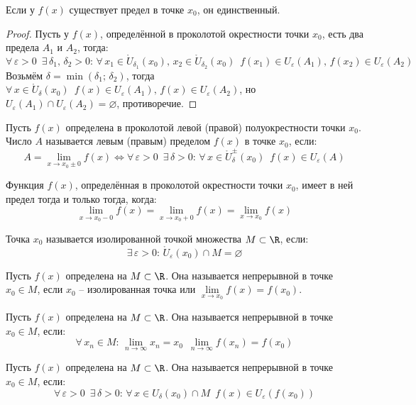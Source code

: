 \documentclass[12pt]{article}
\begin{document}
\begin{theorem}
    Если у $f(x)$ существует предел в точке $x_0$, он единственный.
\end{theorem}
\begin{proof}
    Пусть у $f(x)$, определённой в проколотой окрестности точки $x_0$, есть два предела $A_1$ и $A_2$, тогда:
    $$\forall\,\varepsilon>0\enspace\exists\,\delta_1,\,\delta_2>0:\,\forall\,x_1\in\mathring{U}_{\delta_1}(x_0),\,x_2\in\mathring{U}_{\delta_2}(x_0)\enspace f(x_1)\in U_\varepsilon(A_1),\,f(x_2)\in U_\varepsilon(A_2)$$
    Возьмём $\delta=\min(\delta_1;\,\delta_2)$, тогда $\forall\,x\in\mathring{U}_\delta(x_0)\enspace f(x)\in U_\varepsilon(A_1),\,f(x)\in U_\varepsilon(A_2)$, но $U_\varepsilon(A_1)\cap U_\varepsilon(A_2)=\varnothing$, противоречие.
\end{proof}
\begin{definition}
    Пусть $f(x)$ определена в проколотой левой (правой) полуокрестности точки $x_0$. Число $A$ называется левым (правым) пределом $f(x)$ в точке $x_0$, если:
    $$A=\lim_{x\to x_0\pm0}f(x)\Longleftrightarrow \forall\,\varepsilon>0\enspace\exists\,\delta>0:\,\forall\,x\in\mathring{U}_\delta^\pm(x_0)\enspace f(x)\in U_\varepsilon(A)$$ 
\end{definition}
\begin{statement}
    Функция $f(x)$, определённая в проколотой окрестности точки $x_0$, имеет в ней предел тогда и только тогда, когда:
    $$\lim_{x\to x_0-0}f(x)=\lim_{x\to x_0+0}f(x)=\lim_{x\to x_0}f(x)$$
\end{statement}
\begin{definition}
    Точка $x_0$ называется изолированной точкой множества $M\subset\R$, если:
    $$\exists\,\varepsilon>0:\,\mathring{U}_\varepsilon(x_0)\cap M=\varnothing$$
\end{definition}
\begin{definition}
    Пусть $f(x)$ определена на $M\subset\R$. Она называется непрерывной в точке $x_0\in M$, если $x_0$ -- изолированная точка или $\lim\limits_{x\to x_0}f(x)=f(x_0)$.
\end{definition}
\begin{definition}
    Пусть $f(x)$ определена на $M\subset\R$. Она называется непрерывной в точке $x_0\in M$, если:
    $$\forall\,x_n\in M:\,\lim_{n\to\infty}x_n=x_0\enspace \lim_{n\to\infty}f(x_n)=f(x_0)$$
\end{definition}
\begin{definition}
    Пусть $f(x)$ определена на $M\subset\R$. Она называется непрерывной в точке $x_0\in M$, если:
    $$\forall\,\varepsilon>0\enspace\exists\,\delta>0:\,\forall\,x\in U_\delta(x_0)\cap M\enspace f(x)\in U_\varepsilon(f(x_0))$$
\end{definition}
\end{document}
